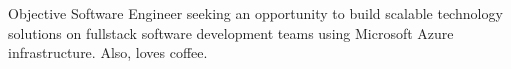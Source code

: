 \begin{section}{Objective}
  Software Engineer seeking an opportunity to build scalable technology solutions on fullstack software development teams using Microsoft Azure infrastructure. Also, loves coffee.
\end{section}
